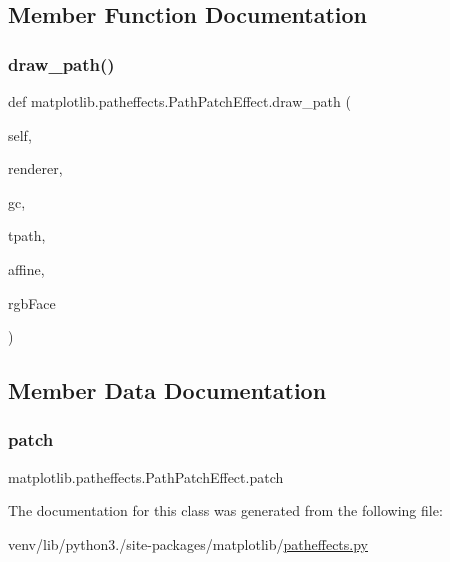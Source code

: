 \subsection{Member Function Documentation}
\mbox{\label{classmatplotlib_1_1patheffects_1_1PathPatchEffect_a7933413b2b187fc8c7404b2981a19dfa}} 
\subsubsection{\texorpdfstring{draw\+\_\+path()}{draw\_path()}}
{\footnotesize\ttfamily def matplotlib.\+patheffects.\+Path\+Patch\+Effect.\+draw\+\_\+path (\begin{DoxyParamCaption}\item[{}]{self,  }\item[{}]{renderer,  }\item[{}]{gc,  }\item[{}]{tpath,  }\item[{}]{affine,  }\item[{}]{rgb\+Face }\end{DoxyParamCaption})}



\subsection{Member Data Documentation}
\mbox{\label{classmatplotlib_1_1patheffects_1_1PathPatchEffect_a679c17057bbed1e543bb0199be2482cd}} 
\subsubsection{\texorpdfstring{patch}{patch}}
{\footnotesize\ttfamily matplotlib.\+patheffects.\+Path\+Patch\+Effect.\+patch}



The documentation for this class was generated from the following file\+:\begin{DoxyCompactItemize}
\item 
venv/lib/python3./site-\/packages/matplotlib/\hyperlink{patheffects_8py}{patheffects.\+py}\end{DoxyCompactItemize}
